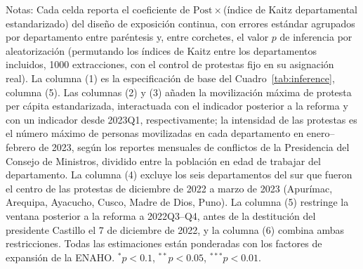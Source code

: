 \begin{table}[!tbp]
\begin{threeparttable}
\begin{tablenotes}
\item Notas: Cada celda reporta el coeficiente de $\mathrm{Post}\times$(índice de Kaitz departamental estandarizado) del diseño de exposición continua, con errores estándar agrupados por departamento entre paréntesis y, entre corchetes, el valor $p$ de inferencia por aleatorización (permutando los índices de Kaitz entre los departamentos incluidos, 1000 extracciones, con el control de protestas fijo en su asignación real). La columna (1) es la especificación de base del Cuadro~\ref{tab:inference}, columna (5). Las columnas (2) y (3) añaden la movilización máxima de protesta per cápita estandarizada, interactuada con el indicador posterior a la reforma y con un indicador desde 2023Q1, respectivamente; la intensidad de las protestas es el número máximo de personas movilizadas en cada departamento en enero--febrero de 2023, según los reportes mensuales de conflictos de la Presidencia del Consejo de Ministros, dividido entre la población en edad de trabajar del departamento. La columna (4) excluye los seis departamentos del sur que fueron el centro de las protestas de diciembre de 2022 a marzo de 2023 (Apur\'imac, Arequipa, Ayacucho, Cusco, Madre de Dios, Puno). La columna (5) restringe la ventana posterior a la reforma a 2022Q3--Q4, antes de la destitución del presidente Castillo el 7 de diciembre de 2022, y la columna (6) combina ambas restricciones. Todas las estimaciones están ponderadas con los factores de expansión de la ENAHO. $^{*}p<0.1$, $^{**}p<0.05$, $^{***}p<0.01$.
\end{tablenotes}
\end{threeparttable}\end{table}

